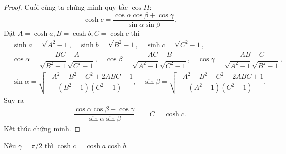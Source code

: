 \begin{proof}
        Cuối cùng ta chứng minh quy tắc $\cos II$: 
        \[\cosh{c} =\dfrac{\cos \alpha \cos \beta + \cos \gamma }{\sin \alpha \sin \beta}.\]
        Đặt $A = \cosh a, B = \cosh b, C = \cosh c$ thì
        \begin{align*}
            &\sinh a = \sqrt{A^2-1},\quad \sinh b = \sqrt{B^2-1},\quad \sinh c = \sqrt{C^2-1},\\
            &\cos \alpha = \dfrac{BC-A}{\sqrt{B^2-1}\sqrt{C^2-1}}, \quad
            \cos \beta = \dfrac{AC-B}{\sqrt{A^2-1}\sqrt{C^2-1}}, \quad 
            \cos \gamma = \dfrac{AB-C}{\sqrt{A^2-1}\sqrt{B^2-1}},\\
            &\sin \alpha = \sqrt{\dfrac{-A^2-B^2-C^2+2ABC+1}{(B^2-1)(C^2-1)}}, \quad
            \sin \beta = \sqrt{\dfrac{-A^2-B^2-C^2+2ABC+1}{(A^2-1)(C^2-1)}}.
        \end{align*}
        Suy ra 
        \begin{align*}
            \dfrac{\cos \alpha \cos \beta + \cos \gamma }{\sin \alpha \sin \beta}
            &= C = \cosh c.
        \end{align*}
        Kết thúc chứng minh.
\end{proof}
\begin{cor}
    Nếu $\gamma = \pi /2$ thì $\cosh c = \cosh a\cosh b$.
\end{cor}